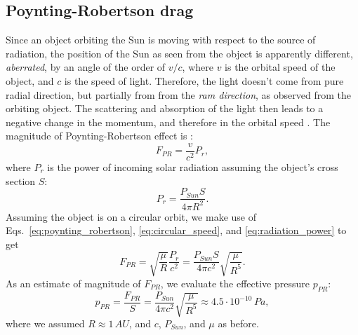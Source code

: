 \subsection{Poynting-Robertson drag} \label{ch:pr_drag}

Since an object orbiting the Sun is moving with respect to the source of radiation, the position of the Sun as seen from the object is apparently different, \textit{aberrated}, by an angle of the order of $v/c$, where $v$ is the orbital speed of the object, and $c$ is the speed of light. Therefore, the light doesn't come from pure radial direction, but partially from from the \textit{ram direction}, as observed from the orbiting object. The scattering and absorption of the light then leads to a negative change in the momentum, and therefore in the orbital speed \citep{poynting1903radiation}. The magnitude of Poynting-Robertson effect is \citep{robertson1937dynamical}:
\begin{equation}
    F_{PR} = \frac{v}{c^2} P_{r},
    \label{eq:poynting_robertson}
\end{equation}
where $P_r$ is the power of incoming solar radiation assuming the object's cross section $S$: 
\begin{equation}
    P_{r} = \frac{P_{Sun} S}{4 \pi R^2}.
    \label{eq:radiation_power}
\end{equation}
Assuming the object is on a circular orbit, we make use of Eqs.~\ref{eq:poynting_robertson}, \ref{eq:circular_speed}, and \ref{eq:radiation_power} to get
\begin{equation}
    F_{PR} = \sqrt{\frac{\mu}{R}} \frac{P_{r}}{c^2} = \frac{P_{Sun}S}{4 \pi c^2} \sqrt{\frac{\mu}{R^5}}. 
\end{equation}
As an estimate of magnitude of $F_{PR}$, we evaluate the effective pressure $p_{PR}$:
\begin{equation}
    p_{PR} = \frac{F_{PR}}{S} = \frac{P_{Sun}}{4 \pi c^2} \sqrt{\frac{\mu}{R^5}} \approx 4.5 \cdot 10^{-10} \, \si{Pa},
\end{equation}
where we assumed $R \approx 1 \, \si{AU}$, and $c$, $P_{Sun}$, and $\mu$ as before.

